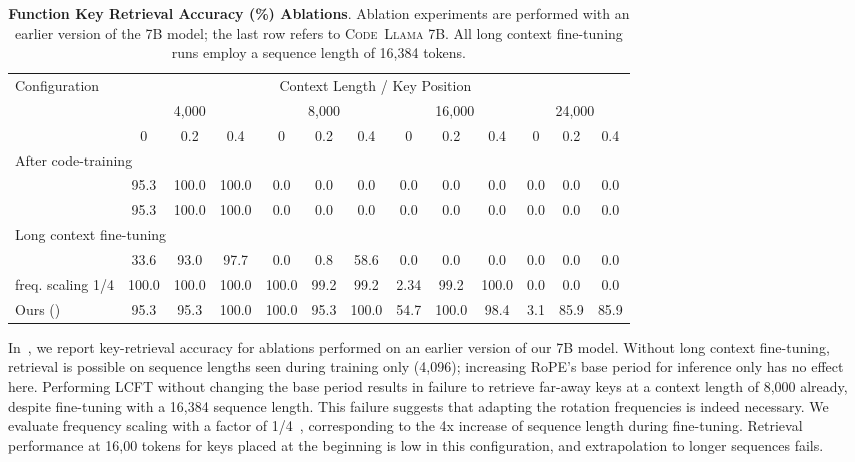 \documentclass[10pt]{article}
\newcommand{\model}{\textsc{Code~Llama}\xspace}
\begin{document}
\begin{table}[]
\centering
\begin{tabular}{lccc|ccc|ccc|ccc}
\toprule
Configuration & \multicolumn{12}{c}{{Context Length / Key Position}} \\
& \multicolumn{3}{c}{4,000} & \multicolumn{3}{c}{8,000} & \multicolumn{3}{c}{16,000} & \multicolumn{3}{c}{24,000} \\
& 0 & 0.2 & 0.4 & 0 & 0.2 & 0.4 & 0 & 0.2 & 0.4 & 0 & 0.2 & 0.4 \\
\midrule
\multicolumn{13}{l}{After code-training} \\
\midrule
 & 95.3 & 100.0 & 100.0 & 0.0 & 0.0 & 0.0 & 0.0 & 0.0 & 0.0 & 0.0 & 0.0 & 0.0 \\
 & 95.3 & 100.0 & 100.0 & 0.0 & 0.0 & 0.0 & 0.0 & 0.0 & 0.0 & 0.0 & 0.0 & 0.0\\
\midrule
\multicolumn{13}{l}{Long context fine-tuning} \\
\midrule
 & 33.6 & 93.0 & 97.7 & 0.0 & 0.8 & 58.6 & 0.0 & 0.0 &  0.0 & 0.0 & 0.0 & 0.0 \\
freq. scaling 1/4 & 100.0 & 100.0 & 100.0 & 100.0 & 99.2 & 99.2 & 2.34 & 99.2 & 100.0 & 0.0 & 0.0 & 0.0 \\
\midrule
Ours () & 95.3 & 95.3 & 100.0 & 100.0 & 95.3 & 100.0 & 54.7 & 100.0 & 98.4 & 3.1 & 85.9 & 85.9 \\
\bottomrule
\end{tabular}\caption{\textbf{Function Key Retrieval Accuracy (\%) Ablations}. Ablation experiments are performed with an earlier version of the 7B model; the last row refers to \model 7B. All long context fine-tuning runs employ a sequence length of 16,384 tokens.
}
\label{tab:retrieval_results_ablations}
\end{table}

In~, we report key-retrieval accuracy for ablations performed on an earlier version of our 7B model.
Without long context fine-tuning, retrieval is possible on sequence lengths seen during training only (4,096); increasing RoPE's base period  for inference only has no effect here.
Performing LCFT without changing the base period results in failure to retrieve far-away keys at a context length of 8,000 already, despite fine-tuning with a 16,384 sequence length.
This failure suggests that adapting the rotation frequencies is indeed necessary.
We evaluate frequency scaling with a factor of 1/4~\citep{chen2023extending}, corresponding to the 4x increase of sequence length during fine-tuning.
Retrieval performance at 16,00 tokens for keys placed at the beginning is low in this configuration, and extrapolation to longer sequences fails.
\end{document}
